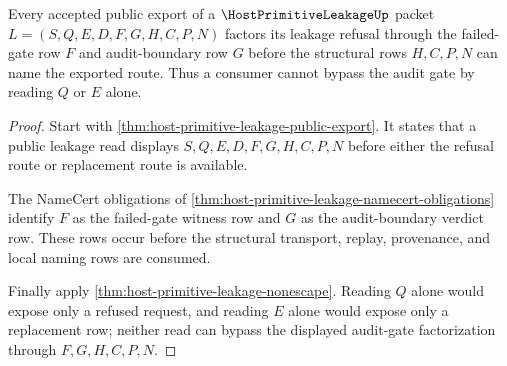 \begin{theorem}
\label{thm:host-primitive-leakage-audit-gate-factorization}
Every accepted public export of a $\HostPrimitiveLeakageUp$ packet $L=(S,Q,E,D,F,G,H,C,P,N)$ factors its leakage refusal through the failed-gate row $F$ and audit-boundary row $G$ before the structural rows $H,C,P,N$ can name the exported route. Thus a consumer cannot bypass the audit gate by reading $Q$ or $E$ alone.
\end{theorem}
\begin{proof}
Start with \autoref{thm:host-primitive-leakage-public-export}. It states that a public leakage read displays $S,Q,E,D,F,G,H,C,P,N$ before either the refusal route or replacement route is available.

The NameCert obligations of \autoref{thm:host-primitive-leakage-namecert-obligations} identify $F$ as the failed-gate witness row and $G$ as the audit-boundary verdict row. These rows occur before the structural transport, replay, provenance, and local naming rows are consumed.

Finally apply \autoref{thm:host-primitive-leakage-nonescape}. Reading $Q$ alone would expose only a refused request, and reading $E$ alone would expose only a replacement row; neither read can bypass the displayed audit-gate factorization through $F,G,H,C,P,N$.
\end{proof}

